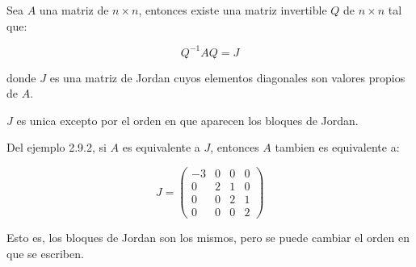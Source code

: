 		\begin{teorema}
			Sea $A$ una matriz de $n \times n$, entonces existe una matriz invertible $Q$ de $n \times n$ tal que:

			\begin{equation}
				Q^{-1} A Q = J
			\end{equation}

			donde $J$ es una matriz de Jordan cuyos elementos diagonales son valores propios de $A$.

			$J$ es unica excepto por el orden en que aparecen los bloques de Jordan.
		\end{teorema}

		\begin{ejemplo}
			Del ejemplo 2.9.2, si $A$ es equivalente a $J$, entonces $A$ tambien es equivalente a:

			\begin{equation*}
				J =
				\begin{pmatrix}
					-3 & 0 & 0 & 0 \\
					0 & 2 & 1 & 0 \\
					0 & 0 & 2 & 1 \\
					0 & 0 & 0 & 2
				\end{pmatrix}
			\end{equation*}

			Esto es, los bloques de Jordan son los mismos, pero se puede cambiar el orden en que se escriben.
		\end{ejemplo}

